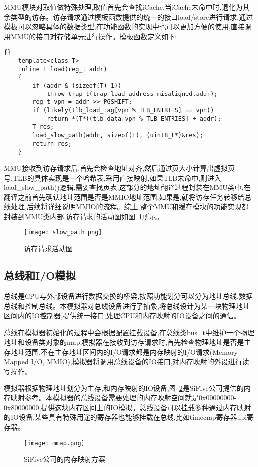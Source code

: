 MMU模块对取值做特殊处理,取值首先会查找iCache,当iCache未命中时,退化为其余类型的访存。访存请求通过模板函数提供的统一的接口load/store进行请求,通过模板可以忽略具体的数据类型,在功能函数的实现中也可以更加方便的使用,直接调用MMU的接口对存储单元进行操作。模板函数定义如下:
\begin{lstlisting}{}
    template<class T>
    inline T load(reg_t addr)
    {
        if (addr & (sizeof(T)-1))
            throw trap_t(trap_load_address_misaligned,addr);
        reg_t vpn = addr >> PGSHIFT;
        if (likely(tlb_load_tag[vpn % TLB_ENTRIES] == vpn))
            return *(T*)(tlb_data[vpn % TLB_ENTRIES] + addr);
        T res;
        load_slow_path(addr, sizeof(T), (uint8_t*)&res);
        return res;
    }    
\end{lstlisting}


MMU接收到访存请求后,首先会检查地址对齐,然后通过页大小计算出虚拟页号,TLB的具体实现是一个哈希表,采用直接映射,如果TLB未命中,则进入load\_slow\_path()逻辑,需要查找页表,这部分的地址翻译过程封装在MMU类中,在翻译之前首先确认地址范围是否是MMIO地址范围,如果是,就将访存任务转移给总线处理,后续将详细说明MMIO的流程。综上,整个MMU和缓存模块的功能实现都封装到MMU类内部,访存请求的活动图如图~\ref{fig:slow_path}所示。
\begin{figure}[H]
    \centering
    \texttt{[image: slow\_path.png]}
    \caption{访存请求活动图}
    \label{fig:slow_path}
\end{figure}

\subsection{总线和I/O模拟}
总线是CPU与外部设备进行数据交换的桥梁,按照功能划分可以分为地址总线,数据总线和控制总线。本模拟器对总线设备进行了抽象,将总线设计为某一块物理地址区间内的IO控制器,提供统一接口,处理CPU和内存映射的IO设备之间的通信。


总线在模拟器初始化的过程中会根据配置挂载设备,在总线类bus\_t中维护一个物理地址和设备类对象的map,模拟器在接收到访存请求时,首先检查物理地址是否是主存地址范围,不在主存地址区间内的I/O请求都是内存映射的I/O请求(Memory-Mapped I/O, MMIO),模拟器将调用总线设备的IO接口,对内存映射的外设进行读写操作。

模拟器根据物理地址划分为主存,和内存映射的IO设备,图~\ref{fig:mmap}是SiFive公司提供的内存映射参考。本模拟器的总线设备需要处理的内存映射空间就是0x00000000-0x80000000,提供这块内存区间上的IO模拟。总线设备可以挂载多种通过内存映射的IO设备,某些具有特殊用途的寄存器也能够挂载在总线,比如timecmp寄存器,ipi寄存器。
\begin{figure}[H]
    \centering
    \texttt{[image: mmap.png]}
    \caption{SiFive公司的内存映射方案}
    \label{fig:mmap}
\end{figure}


